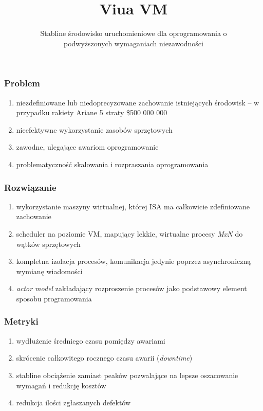 \documentclass{beamer}
\title{Viua VM}
\subtitle{Stabline środowisko uruchomieniowe dla oprogramowania o\\podwyższonych wymaganiach niezawodności}
\begin{document}

\frame{\titlepage}

\begin{frame}
    \frametitle{Problem}

    \begin{enumerate}
        \item niezdefiniowane lub niedoprecyzowane zachowanie istniejących
            środowisk -- w przypadku rakiety Ariane 5 straty \$500 000 000
        \item nieefektywne wykorzystanie zasobów sprzętowych
        \item zawodne, ulegające awariom oprogramowanie
        \item problematyczność skalowania i rozpraszania oprogramowania
    \end{enumerate}
\end{frame}

\begin{frame}
    \frametitle{Rozwiązanie}

    \begin{enumerate}
        \item wykorzystanie maszyny wirtualnej, której ISA ma całkowicie
            zdefiniowane zachowanie
        \item scheduler na poziomie VM, mapujący lekkie, wirtualne procesy
            \emph{MxN} do wątków sprzętowych
        \item kompletna izolacja procesów, komunikacja jedynie poprzez
            asynchroniczną wymianę wiadomości
        \item \emph{actor model} zakładający rozproszenie procesów jako
            podstawowy element sposobu programowania
    \end{enumerate}
\end{frame}

\begin{frame}
    \frametitle{Metryki}

    \begin{enumerate}
        \item wydłużenie średniego czasu pomiędzy awariami
        \item skrócenie całkowitego rocznego czasu awarii (\emph{downtime})
        \item stabline obciążenie zamiast peaków pozwalające na lepsze
            oszacowanie wymagań i redukcję kosztów
        \item redukcja ilości zgłaszanych defektów
    \end{enumerate}
\end{frame}
\end{document}
